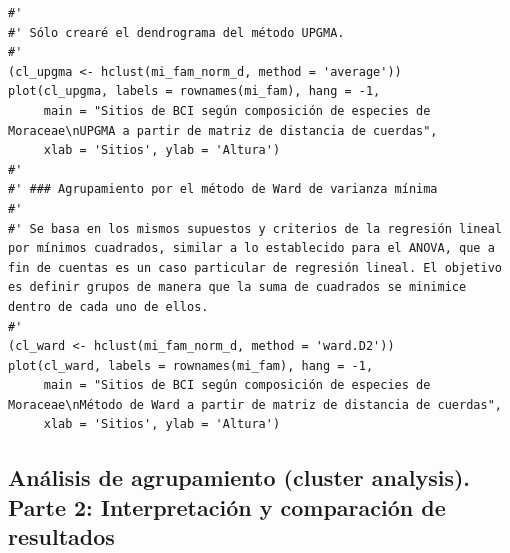 \documentclass[11pt,]{article}
\begin{document}
\begin{verbatim}
#' 
#' Sólo crearé el dendrograma del método UPGMA.
#' 
(cl_upgma <- hclust(mi_fam_norm_d, method = 'average'))
plot(cl_upgma, labels = rownames(mi_fam), hang = -1,
     main = "Sitios de BCI según composición de especies de Moraceae\nUPGMA a partir de matriz de distancia de cuerdas",
     xlab = 'Sitios', ylab = 'Altura')
#' 
#' ### Agrupamiento por el método de Ward de varianza mínima
#' 
#' Se basa en los mismos supuestos y criterios de la regresión lineal por mínimos cuadrados, similar a lo establecido para el ANOVA, que a fin de cuentas es un caso particular de regresión lineal. El objetivo es definir grupos de manera que la suma de cuadrados se minimice dentro de cada uno de ellos.
#' 
(cl_ward <- hclust(mi_fam_norm_d, method = 'ward.D2'))
plot(cl_ward, labels = rownames(mi_fam), hang = -1,
     main = "Sitios de BCI según composición de especies de Moraceae\nMétodo de Ward a partir de matriz de distancia de cuerdas",
     xlab = 'Sitios', ylab = 'Altura')
\end{verbatim}

\subsection{Análisis de agrupamiento (cluster analysis). Parte 2:
Interpretación y comparación de
resultados}\label{anuxe1lisis-de-agrupamiento-cluster-analysis.-parte-2-interpretaciuxf3n-y-comparaciuxf3n-de-resultados}
\end{document}
